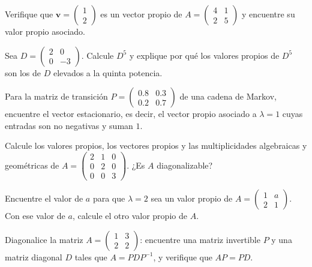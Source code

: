 \begin{prob}
Verifique que $\mathbf{v}=\begin{pmatrix} 1 \\ 2 \end{pmatrix}$ es un vector propio de $A=\begin{pmatrix} 4 & 1 \\ 2 & 5 \end{pmatrix}$ y encuentre su valor propio asociado.
\end{prob}

\begin{prob}
Sea $D=\begin{pmatrix} 2 & 0 \\ 0 & -3 \end{pmatrix}$. Calcule $D^{5}$ y explique por qué los valores propios de $D^{5}$ son los de $D$ elevados a la quinta potencia.
\end{prob}

\begin{prob}
Para la matriz de transición $P=\begin{pmatrix} 0.8 & 0.3 \\ 0.2 & 0.7 \end{pmatrix}$ de una cadena de Markov, encuentre el vector estacionario, es decir, el vector propio asociado a $\lambda=1$ cuyas entradas son no negativas y suman $1$.
\end{prob}

\begin{prob}
Calcule los valores propios, los vectores propios y las multiplicidades algebraicas y geométricas de
$A=\begin{pmatrix} 2 & 1 & 0 \\ 0 & 2 & 0 \\ 0 & 0 & 3 \end{pmatrix}$.
¿Es $A$ diagonalizable?
\end{prob}

\begin{prob}
Encuentre el valor de $a$ para que $\lambda=2$ sea un valor propio de $A=\begin{pmatrix} 1 & a \\ 2 & 1 \end{pmatrix}$. Con ese valor de $a$, calcule el otro valor propio de $A$.
\end{prob}

\begin{prob}
Diagonalice la matriz $A=\begin{pmatrix} 1 & 3 \\ 2 & 2 \end{pmatrix}$: encuentre una matriz invertible $P$ y una matriz diagonal $D$ tales que $A=PDP^{-1}$, y verifique que $AP=PD$.
\end{prob}

